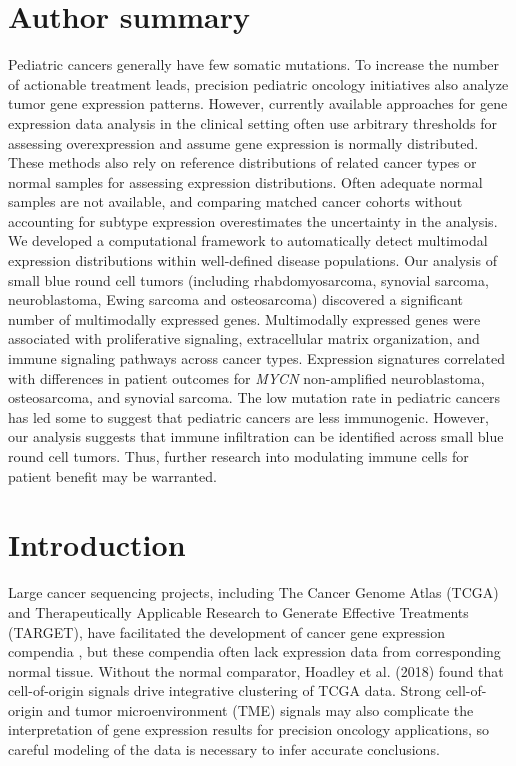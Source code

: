 \documentclass[10pt,letterpaper]{article}
\begin{document}
\section*{Author summary}
Pediatric cancers generally have few somatic mutations. To increase the number of actionable treatment leads, precision pediatric oncology initiatives also analyze tumor gene expression patterns. However, currently available approaches for gene expression data analysis in the clinical setting often use arbitrary thresholds for assessing overexpression and assume gene expression is normally distributed. These methods also rely on reference distributions of related cancer types or normal samples for assessing expression distributions. Often adequate normal samples are not available, and comparing matched cancer cohorts without accounting for subtype expression overestimates the uncertainty in the analysis. We developed a computational framework to automatically detect multimodal expression distributions within well-defined disease populations. Our analysis of small blue round cell tumors (including rhabdomyosarcoma, synovial sarcoma, neuroblastoma, Ewing sarcoma and osteosarcoma) discovered a significant number of multimodally expressed genes. Multimodally expressed genes were associated with proliferative signaling, extracellular matrix organization, and immune signaling pathways across cancer types. Expression signatures correlated with differences in patient outcomes for \textit{MYCN} non-amplified neuroblastoma, osteosarcoma, and synovial sarcoma. The low mutation rate in pediatric cancers has led some to suggest that pediatric cancers are less immunogenic. However, our analysis suggests that immune infiltration can be identified across small blue round cell tumors. Thus, further research into modulating immune cells for patient benefit may be warranted.

\linenumbers

\section*{Introduction}
Large cancer sequencing projects, including The Cancer Genome Atlas (TCGA) and Therapeutically Applicable Research to Generate Effective Treatments (TARGET), have facilitated the development of cancer gene expression compendia \cite{vivianToilEnablesReproducible2017, pughGeneticLandscapeHighrisk2013, goldmanUCSCXenaPlatform2018, thecancergenomeatlasresearchnetworkCancerGenomeAtlas2013, newtonTumorMapExploringMolecular2017, vaskeComparativeTumorRNA2019}, but these compendia often lack expression data from corresponding normal tissue. Without the normal comparator, Hoadley et al. (2018) found that cell-of-origin signals drive integrative clustering of TCGA data. Strong cell-of-origin and tumor microenvironment (TME) signals may also complicate the interpretation of gene expression results for precision oncology applications, so careful modeling of the data is necessary to infer accurate conclusions.
\end{document}
